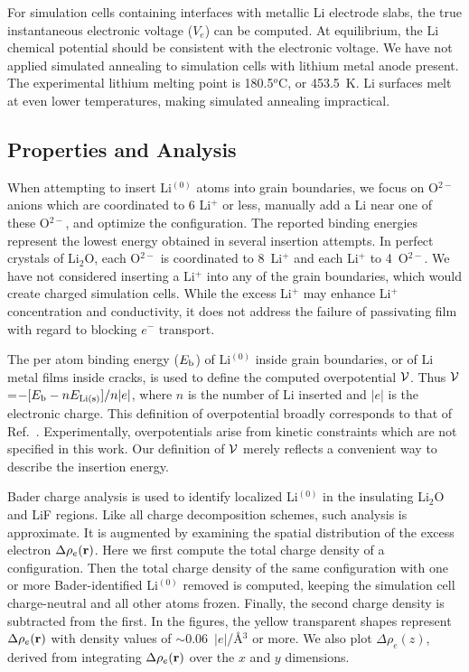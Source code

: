 \documentclass[prb,preprint,amsmath,amssymb]{revtex4}
\begin{document}
For simulation cells containing interfaces with metallic Li electrode slabs,
the true instantaneous electronic voltage ($V_e$) can be computed.
At equilibrium, the Li chemical potential should be consistent with the
electronic voltage.\cite{solid}  We have not applied simulated
annealing to simulation cells with lithium metal anode present.  The
experimental lithium melting point is 180.5$^o$C, or 453.5~K.  Li surfaces
melt at even lower temperatures, making simulated annealing impractical.

\subsection*{Properties and Analysis}

When attempting to insert Li$^{(0)}$ atoms into grain boundaries,
we focus on O$^{2-}$ anions which are coordinated to 6 Li$^+$ or less,
manually add a Li near one of these O$^{2-}$, and optimize the configuration.
The reported binding energies represent the lowest energy obtained in several
insertion attempts.  In perfect crystals of Li$_2$O, each O$^{2-}$ is
coordinated to 8~Li$^+$ and each Li$^+$ to 4~O$^{2-}$.  
We have not considered inserting a Li$^+$ into any of the grain boundaries,
which would create charged simulation cells.  While the excess Li$^+$ may
enhance Li$^+$ concentration and conductivity, it does not address the
failure of passivating film with regard to blocking $e^-$ transport.

The per atom binding energy ($E_{\rm b}$) of Li$^{(0)}$ inside
grain boundaries, or of Li metal films inside cracks, is used to define the
computed overpotential ${\cal V}$.  Thus
${\cal V}$=$-[E_{\rm b}-n E_{\rm Li(s)}]/n|e|$, where $n$ is the number of Li
inserted and $|e|$ is the electronic charge.  This definition of overpotential
broadly corresponds to that of Ref.~.  Experimentally,
overpotentials arise from kinetic constraints which are not specified in
this work.  Our definition of ${\cal V}$ merely reflects a convenient way to
describe the insertion energy.

Bader charge analysis\cite{bader} is used to identify localized Li$^{(0)}$
in the insulating Li$_2$O and LiF regions.  Like all charge decomposition
schemes, such analysis is approximate.  It is augmented by examining
the spatial distribution of the excess electron
$\Delta \rho_e({\bf r})$.  Here we first compute the total charge density of a
configuration.  Then the total charge density of the same configuration with
one or more Bader-identified Li$^{(0)}$ removed is computed, keeping the
simulation cell charge-neutral and all other atoms frozen.  Finally, the second
charge density is subtracted from the first.  In the figures, the yellow
transparent shapes represent $\Delta \rho_e({\bf r})$ with density values of
$\sim$0.06~$|e|$/\AA$^3$ or more.  We also plot $\Delta \rho_e(z)$, derived
from integrating $\Delta \rho_e({\bf r})$ over the $x$ and $y$ dimensions.
\end{document}
